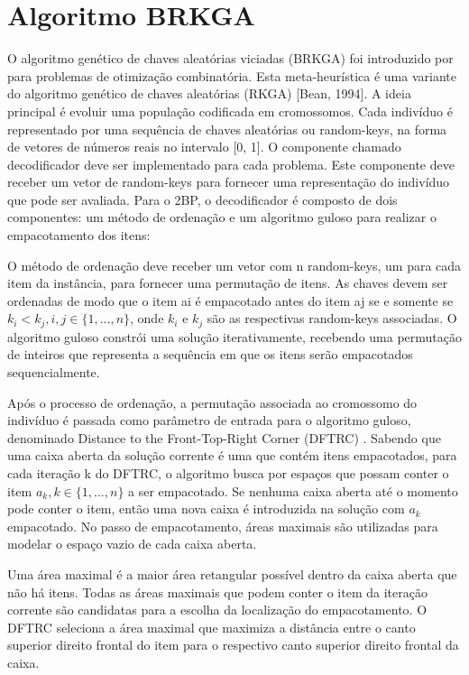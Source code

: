 \documentclass[article]{rian_article}
\begin{document}
\section{Algoritmo BRKGA}\label{sec:corte}
O algoritmo genético de chaves aleatórias viciadas (BRKGA) foi introduzido por \citet{resende2011} para problemas de otimização combinatória. Esta meta-heurística é uma variante do algoritmo genético de chaves aleatórias (RKGA) [Bean, 1994]. 
A ideia principal é evoluir uma população codificada em cromossomos. Cada indivíduo é representado por uma sequência de chaves aleatórias ou random-keys, na forma de vetores de números reais no intervalo [0, 1].
O componente chamado decodificador deve ser implementado para cada problema. Este componente deve receber um vetor de random-keys para fornecer uma representação do indivíduo que pode ser avaliada. Para o 2BP, o decodificador é composto de dois componentes: um método de ordenação e um algoritmo guloso para realizar o empacotamento dos itens:

O método de ordenação deve receber um vetor com n random-keys, um para cada item da instância, para fornecer uma permutação de itens. As chaves devem ser ordenadas de modo que o item ai é empacotado antes do item aj se e somente se $k_{i} < k_{j}, {i}, {j} \in \{1, ..., {n}\}$, onde $k_{i}$ e $k_{j}$ são as respectivas random-keys associadas.
O algoritmo guloso constrói uma solução iterativamente, recebendo uma permutação de inteiros que representa a sequência em que os itens serão empacotados sequencialmente.

Após o processo de ordenação, a permutação associada ao cromossomo do indivíduo é passada como parâmetro de entrada para o algoritmo guloso, denominado Distance to the Front-Top-Right Corner (DFTRC) \citep{resende2013}. Sabendo que uma caixa aberta da solução corrente é uma que contém itens empacotados, para cada iteração {k} do DFTRC, o algoritmo busca por espaços que possam conter o item  $a_{k}, {k} \in \{1, ..., {n}\}$ a ser empacotado. Se nenhuma caixa aberta até o momento pode conter o item, então uma nova caixa é introduzida na solução com $a_{k}$ empacotado. No passo de empacotamento, áreas maximais são utilizadas para modelar o espaço vazio de cada caixa aberta. 

Uma área maximal é a maior área retangular possível dentro da caixa aberta que não há itens. Todas as áreas maximais que podem conter o item da iteração corrente são candidatas para a escolha da localização do empacotamento. O DFTRC seleciona a área maximal que maximiza a distância entre o canto superior direito frontal do item para o respectivo canto superior direito frontal da caixa.
\end{document}
